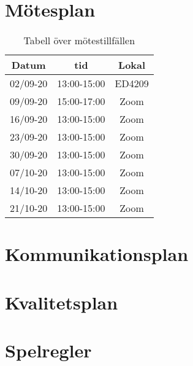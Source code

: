 \documentclass{article}
\begin{document}
\section{Mötesplan}
\begin{table}[!h]
    \begin{center}
    \begin{tabular}{ |c|c|c| } 
    \hline
    Datum & tid & Lokal \\
    \hline\hline
    02/09-20 & 13:00-15:00 & ED4209 \\\hline
    09/09-20 & 15:00-17:00 & Zoom \\\hline
    16/09-20 & 13:00-15:00 & Zoom \\\hline
    23/09-20 & 13:00-15:00 & Zoom \\\hline
    30/09-20 & 13:00-15:00 & Zoom \\\hline
    07/10-20 & 13:00-15:00 & Zoom \\\hline
    14/10-20 & 13:00-15:00 & Zoom \\\hline
    21/10-20 & 13:00-15:00 & Zoom \\\hline
    \end{tabular}
    \caption{Tabell över mötestillfällen}
    \label{motesplan}
    \end{center}
\end{table}

\section{Kommunikationsplan}

\section{Kvalitetsplan}

\section{Spelregler}



\end{document}
